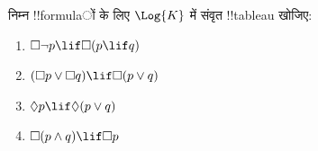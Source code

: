 \documentclass[../../../include/open-logic-section]{subfiles}
\begin{document}
\begin{prob}
  निम्न !!{formula}ों के लिए $\Log{K}$ में संवृत !!{tableau} खोजिए:
  \begin{enumerate}
    \item $\Box \lnot p \lif \Box(p \lif q)$
    \item $(\Box p \lor \Box q) \lif \Box(p \lor q)$
    \item $\Diamond p \lif \Diamond(p \lor q)$
    \item $\Box(p \land q) \lif \Box p$
  \end{enumerate}
\end{prob}
\end{document}
